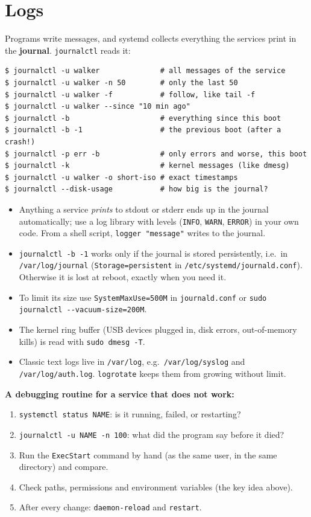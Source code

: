 \section*{Logs}
Programs write messages, and systemd collects everything the services print in the \textbf{journal}. \texttt{journalctl} reads it:
\begin{verbatim}
$ journalctl -u walker              # all messages of the service
$ journalctl -u walker -n 50        # only the last 50
$ journalctl -u walker -f           # follow, like tail -f
$ journalctl -u walker --since "10 min ago"
$ journalctl -b                     # everything since this boot
$ journalctl -b -1                  # the previous boot (after a crash!)
$ journalctl -p err -b              # only errors and worse, this boot
$ journalctl -k                     # kernel messages (like dmesg)
$ journalctl -u walker -o short-iso # exact timestamps
$ journalctl --disk-usage           # how big is the journal?
\end{verbatim}
\begin{itemize}[nosep]
  \item Anything a service \emph{prints} to stdout or stderr ends up in the journal automatically; use a log library with levels (\texttt{INFO}, \texttt{WARN}, \texttt{ERROR}) in your own code. From a shell script, \texttt{logger "message"} writes to the journal.
  \item \verb|journalctl -b -1| works only if the journal is stored persistently, i.e.\ in \texttt{/var/log/journal} (\texttt{Storage=persistent} in \texttt{/etc/systemd/journald.conf}). Otherwise it is lost at reboot, exactly when you need it.
  \item To limit its size use \texttt{SystemMaxUse=500M} in \texttt{journald.conf} or \verb|sudo journalctl --vacuum-size=200M|.
  \item The kernel ring buffer (USB devices plugged in, disk errors, out-of-memory kills) is read with \verb|sudo dmesg -T|.
  \item Classic text logs live in \texttt{/var/log}, e.g.\ \texttt{/var/log/syslog} and \texttt{/var/log/auth.log}. \texttt{logrotate} keeps them from growing without limit.
\end{itemize}

\textbf{A debugging routine for a service that does not work:}
\begin{enumerate}[nosep]
  \item \verb|systemctl status NAME|: is it running, failed, or restarting?
  \item \verb|journalctl -u NAME -n 100|: what did the program say before it died?
  \item Run the \texttt{ExecStart} command by hand (as the same user, in the same directory) and compare.
  \item Check paths, permissions and environment variables (the key idea above).
  \item After every change: \texttt{daemon-reload} and \texttt{restart}.
\end{enumerate}

